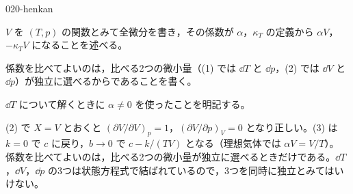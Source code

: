 \documentclass[uplatex,dvipdfmx,a4paper,11pt]{jsarticle}
\begin{document}
\begin{kaisetsu}{020-henkan}
\begin{ronten}
  \item {} $V$ を $(T,p)$ の関数とみて全微分を書き，その係数が $\alpha$，$\kappa_{T}$ の定義から $\alpha V$，$-\kappa_{T}V$ になることを述べる。
  \item 係数を比べてよいのは，比べる2つの微小量（(1) では $\dd T$ と $\dd p$，(2) では $\dd V$ と $\dd p$）が独立に選べるからであることを書く。
  \item {} $\dd T$ について解くときに $\alpha \neq 0$ を使ったことを明記する。
\end{ronten}
\kenzan (2) で $X = V$ とおくと $(\partial V/\partial V)_{p} = 1$，$(\partial V/\partial p)_{V} = 0$ となり正しい。(3) は $k = 0$ で $c$ に戻り，$b \to 0$ で $c - k/(TV)$ となる（理想気体では $\alpha V = V/T$）。
\tsumazuki 係数を比べてよいのは，比べる2つの微小量が独立に選べるときだけである。$\dd T$，$\dd V$，$\dd p$ の3つは状態方程式で結ばれているので，3つを同時に独立とみてはいけない。
\end{kaisetsu}
\end{document}
